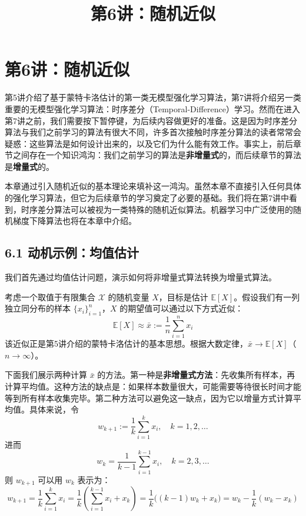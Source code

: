 \documentclass[UTF8]{article}
\title{第6讲：随机近似}
\author{}
\date{}
\begin{document}
\maketitle
\thispagestyle{empty}

\section*{第6讲：随机近似}

第5讲介绍了基于蒙特卡洛估计的第一类无模型强化学习算法，第7讲将介绍另一类重要的无模型强化学习算法：时序差分（Temporal-Difference）学习。然而在进入第7讲之前，我们需要按下暂停键，为后续内容做更好的准备。这是因为时序差分算法与我们之前学习的算法有很大不同，许多首次接触时序差分算法的读者常常会疑惑：这些算法是如何设计出来的，以及它们为什么能有效工作。事实上，前后章节之间存在一个知识鸿沟：我们之前学习的算法是\textbf{非增量式}的，而后续章节的算法是\textbf{增量式}的。

本章通过引入随机近似的基本理论来填补这一鸿沟。虽然本章不直接引入任何具体的强化学习算法，但它为后续章节的学习奠定了必要的基础。我们将在第7讲中看到，时序差分算法可以被视为一类特殊的随机近似算法。机器学习中广泛使用的随机梯度下降算法也将在本章中介绍。

\subsection*{6.1 动机示例：均值估计}

我们首先通过均值估计问题，演示如何将非增量式算法转换为增量式算法。

考虑一个取值于有限集合 $\mathcal{X}$ 的随机变量 $X$，目标是估计 $\mathbb{E}[X]$。假设我们有一列独立同分布的样本 $\{x_i\}_{i=1}^{n}$，$X$ 的期望值可以通过以下方式近似：
\[
\mathbb{E}[X] \approx \bar{x} := \frac{1}{n}\sum_{i=1}^{n} x_i
\]
该近似正是第5讲介绍的蒙特卡洛估计的基本思想。根据大数定律，$\bar{x} \to \mathbb{E}[X]$（$n \to \infty$）。

下面我们展示两种计算 $\bar{x}$ 的方法。第一种是\textbf{非增量式方法}：先收集所有样本，再计算平均值。这种方法的缺点是：如果样本数量很大，可能需要等待很长时间才能等到所有样本收集完毕。第二种方法可以避免这一缺点，因为它以增量方式计算平均值。具体来说，令
\[
w_{k+1} := \frac{1}{k}\sum_{i=1}^{k} x_i, \quad k = 1,2,\dots
\]
进而
\[
w_k = \frac{1}{k-1}\sum_{i=1}^{k-1} x_i, \quad k = 2,3,\dots
\]
则 $w_{k+1}$ 可以用 $w_k$ 表示为：
\[
w_{k+1} = \frac{1}{k}\sum_{i=1}^{k} x_i = \frac{1}{k}\left( \sum_{i=1}^{k-1} x_i + x_k \right)
= \frac{1}{k}\big((k-1)w_k + x_k\big) = w_k - \frac{1}{k}(w_k - x_k)
\]
\end{document}
